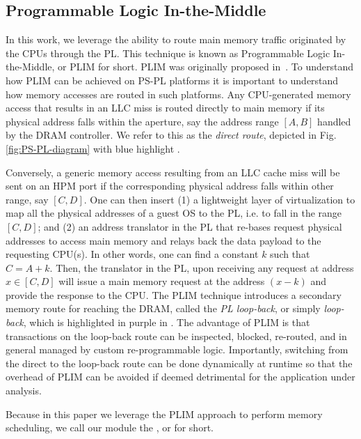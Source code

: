 \subsection{Programmable Logic In-the-Middle}\label{sec:bg_plim}
In this work, we leverage the ability to route main memory traffic
originated by the CPUs through the PL. This technique is known as
Programmable Logic In-the-Middle, or PLIM for short. PLIM was
originally proposed in~\cite{PLIM20}. To understand how PLIM can be
achieved on PS-PL platforms it is important to understand how memory
accesses are routed in such platforms. Any CPU-generated memory access
that results in an LLC miss is routed directly to main memory if its
physical address falls within the aperture, say the address range
$[A,B]$ handled by the DRAM controller. We refer to this as the
\emph{direct route}, depicted in Fig. \ref{fig:PS-PL-diagram} with
blue highlight .

Conversely, a generic memory access resulting from an LLC cache miss
will be sent on an HPM port if the corresponding physical address
falls within other range, say $[C,D]$. One can then insert (1) a
lightweight layer of virtualization to map all the physical addresses
of a guest OS to the PL, i.e. to fall in the range $[C,D]$; and (2) an
address translator in the PL that re-bases request physical addresses
to access main memory and relays back the data payload to the
requesting CPU(s). In other words, one can find a constant $k$ such
that $C = A + k$. Then, the translator in the PL, upon receiving any
request at address $x \in [C, D]$ will issue a main memory request at
the address $(x - k)$ and provide the response to the CPU.  The PLIM
technique introduces a secondary memory route for reaching the DRAM,
called the \emph{PL loop-back}, or simply \emph{loop-back}, which is
highlighted in purple in . The
advantage of PLIM is that transactions on the loop-back route can be
inspected, blocked, re-routed, and in general managed by custom
re-programmable logic. Importantly, switching from the direct to the
loop-back route can be done dynamically at runtime so that the
overhead of PLIM can be avoided if deemed detrimental for the
application under analysis.

Because in this paper we leverage the PLIM approach to perform memory
scheduling, we call our module the \schimL, or \schim for short.


